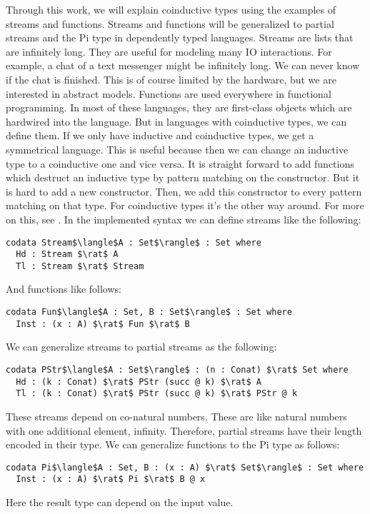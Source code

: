 \documentclass[a4paper,cleardoubleempty,BCOR1cm]{scrbook}
\begin{document}
Through this work, we will explain coinductive types using the examples of streams
and functions. Streams and functions will be generalized to partial streams
and the Pi type in dependently typed languages. Streams are lists that are
infinitely long. They are useful for modeling many IO interactions. For
example, a chat of a text messenger might be infinitely long. We can never
know if the chat is finished. This is of course limited by the hardware, but
we are interested in abstract models. Functions are used everywhere in
functional programming. In most of these languages, they are first-class
objects which are hardwired into the language. But in languages with
coinductive types, we can define them. If we only have inductive and
coinductive types, we get a symmetrical language. This is useful because then
we can change an inductive type to a coinductive one and vice versa. It is
straight forward to add functions which destruct an inductive type by
pattern matching on the constructor. But it is hard to add a new constructor.
Then, we add this constructor to every pattern matching on that type.
For coinductive types it's the other way around. For more on this, see
\cite{binder2019decomposition}. In the implemented syntax we can define streams
like the following:
\begin{lstlisting}
codata Stream$\langle$A : Set$\rangle$ : Set where
  Hd : Stream $\rat$ A
  Tl : Stream $\rat$ Stream
\end{lstlisting}
And functions like follows:
\begin{lstlisting}
codata Fun$\langle$A : Set, B : Set$\rangle$ : Set where
  Inst : (x : A) $\rat$ Fun $\rat$ B
\end{lstlisting}
We can generalize streams to partial streams as the following:
\begin{lstlisting}
codata PStr$\langle$A : Set$\rangle$ : (n : Conat) $\rat$ Set where
  Hd : (k : Conat) $\rat$ PStr (succ @ k) $\rat$ A
  Tl : (k : Conat) $\rat$ PStr (succ @ k) $\rat$ PStr @ k
\end{lstlisting}
These streams depend on co-natural numbers.  These are like natural numbers
with one additional element, infinity.  Therefore, partial streams have
their length encoded in their type. We can generalize functions to the Pi type
as follows:
\begin{lstlisting}
codata Pi$\langle$A : Set, B : (x : A) $\rat$ Set$\rangle$ : Set where
  Inst : (x : A) $\rat$ Pi $\rat$ B @ x
\end{lstlisting}
Here the result type can depend on the input value.
\end{document}
